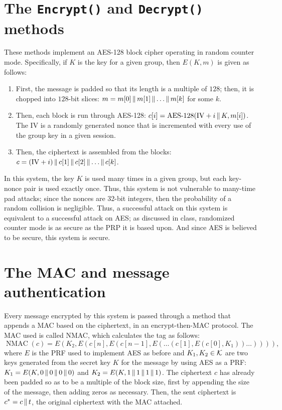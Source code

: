 \documentclass{amsart}
\begin{document}
\section{The \texttt{Encrypt()} and \texttt{Decrypt()} methods}%
These methods implement an AES-128 block cipher operating in random counter mode. Specifically, if $K$ is the key for a given group, then $E(K,m)$ is given as follows:
\begin{enumerate}
\item First, the message is padded so that its length is a multiple of $128$; then, it is chopped into $128$-bit slices: $m = m[0]\operatorname{\|} m[1]\operatorname{\|}\dots\operatorname{\|} m[k]$ for some $k$.
\item Then, each block is run through AES-128: $c[i] = \operatorname{AES-128}(\mathrm{IV} + i\operatorname{\|} K,m[i])$. The $\mathrm{IV}$ is a randomly generated nonce that is incremented with every use of the group key in a given session.
\item Then, the ciphertext is assembled from the blocks: $c = (\mathrm{IV} + i) \operatorname{\|} c[1] \operatorname{\|} c[2] \operatorname{\|}\dots\operatorname{\|} c[k]$.
\end{enumerate}
In this system, the key $K$ is used many times in a given group, but each key-nonce pair is used exactly once. Thus, this system is not vulnerable to many-time pad attacks; since the nonces are 32-bit integers, then the probability of a random collision is negligible. Thus, a successful attack on this system is equivalent to a successful attack on AES; as discussed in class, randomized counter mode is as secure as the PRP it is based upon. And since AES is believed to be secure, this system is secure.

\section{The MAC and message authentication}
Every message encrypted by this system is passed through a method that appends a MAC based on the ciphertext, in an encrypt-then-MAC protocol. The MAC used is called NMAC, which calculates the tag as follows:
\[\operatorname{NMAC}(c) = E(K_2,E(c[n],E(c[n-1],E(\dots(c[1],E(c[0],K_1))\dots)))),\]
where $E$ is the PRF used to implement AES as before and $K_1,K_2\in\mathcal K$ are two keys generated from the secret key $K$ for the message by using AES as a PRF: $K_1 = E(K,0\operatorname{\|} 0\operatorname{\|} 0\operatorname{\|} 0)$ and $K_2 = E(K,1\operatorname{\|} 1\operatorname{\|} 1\operatorname{\|} 1)$. The ciphertext $c$ has already been padded so as to be a multiple of the block size, first by appending the size of the message, then adding zeros as necessary. Then, the sent ciphertext is $c^* = c\operatorname{\|} t$, the original ciphertext with the MAC attached.
\end{document}
